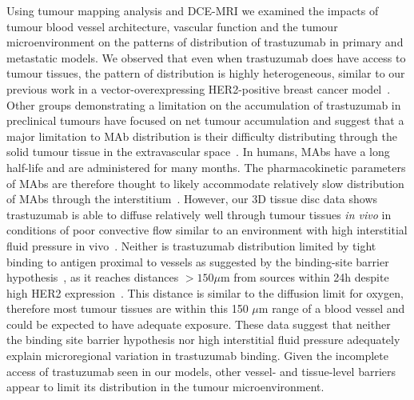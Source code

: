 Using tumour mapping analysis and \acs{DCE-MRI} we examined the impacts of tumour blood vessel architecture, vascular function and the tumour microenvironment on the patterns of distribution of trastuzumab in primary and metastatic models.
We observed that even when trastuzumab does have access to tumour tissues, the pattern of distribution is highly heterogeneous, similar to our previous work in a vector-overexpressing \acs{HER2}-positive breast cancer model~\cite{Baker:2008ci}.
Other groups demonstrating a limitation on the accumulation of trastuzumab in preclinical tumours have focused on net tumour accumulation and suggest that a major limitation to \acs{MAb} distribution is their difficulty distributing through the solid tumour tissue in the extravascular space~\cite{Jain:2010ie,Chauhan:2011fi,Lee:2010gb}.
In humans, \acs{MAb}s have a long half-life and are administered for many months.
The pharmacokinetic parameters of \acs{MAb}s are therefore thought to likely accommodate relatively slow distribution of \acs{MAb}s through the interstitium~\cite{Chauhan:2011fi,Thurber:2012dd}.
However, our 3D tissue disc data shows trastuzumab is able to diffuse relatively well through tumour tissues \emph{in vivo} in conditions of poor convective flow similar to an environment with high interstitial fluid pressure in vivo~\cite{Baker:2018ex}.
Neither is trastuzumab distribution limited by tight binding to antigen proximal to vessels as suggested by the binding-site barrier hypothesis~\cite{Juweid:1992ty}, as it reaches distances $>150 \mu$m from sources within 24h despite high \acs{HER2} expression~\cite{Baker:2018ex}.
This distance is similar to the diffusion limit for oxygen, therefore most tumour tissues are within this 150 $\mu$m range of a blood vessel and could be expected to have adequate exposure.
These data suggest that neither the binding site barrier hypothesis nor high interstitial fluid pressure adequately explain microregional variation in trastuzumab binding.
Given the incomplete access of trastuzumab seen in our models, other vessel- and tissue-level barriers appear to limit its distribution in the tumour microenvironment.

